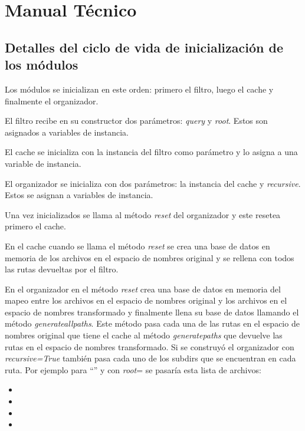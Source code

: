 \chapter{Manual Técnico}

\section{Detalles del ciclo de vida de inicialización de los módulos}
\label{detallesciclodevida}

Los módulos se inicializan en este orden: primero el filtro, luego el cache y finalmente el organizador.

El filtro recibe en su constructor dos parámetros: \textit{query} y \textit{root}. Estos son asignados a variables de instancia.

El cache se inicializa con la instancia del filtro como parámetro y lo asigna a una variable de instancia.

El organizador se inicializa con dos parámetros: la instancia del cache y \textit{recursive}. Estos se asignan a variables de instancia.

Una vez inicializados se llama al método \textit{reset} del organizador y este resetea primero el cache.

En el cache cuando se llama el método \textit{reset} se crea una base de datos en memoria de los archivos en el espacio de nombres original y se rellena con todos las rutas devueltas por el filtro.

En el organizador en el método \textit{reset} crea una base de datos en memoria del mapeo entre los archivos en el espacio de nombres original y los archivos en el espacio de nombres transformado y finalmente llena su base de datos llamando el método \textit{generateallpaths}. Este método pasa cada una de las rutas en el espacio de nombres original que tiene el cache al método \textit{generatepaths} que devuelve las rutas en el espacio de nombres transformado. Si se construyó el organizador con \textit{recursive=True} también pasa cada uno de los subdirs que se encuentran en cada ruta. Por ejemplo para ``'' y con \textit{root}= se pasaría esta lista de archivos:

\begin{itemize}
\item {}
\item {}
\item {}
\item {}
\end{itemize}

